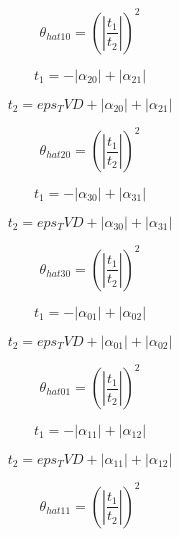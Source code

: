 \documentclass{article}
\begin{document}
\begin{dmath}\theta_{hat 10} = \left(\left|{\frac{t_{1}}{t_{2}}}\right| \right)^{2}\end{dmath}

\begin{dmath}t_{1} = - \left|{\alpha_{20}}\right| + \left|{\alpha_{21}}\right|\end{dmath}

\begin{dmath}t_{2} = eps_TVD + \left|{\alpha_{20}}\right| + \left|{\alpha_{21}}\right|\end{dmath}

\begin{dmath}\theta_{hat 20} = \left(\left|{\frac{t_{1}}{t_{2}}}\right| \right)^{2}\end{dmath}

\begin{dmath}t_{1} = - \left|{\alpha_{30}}\right| + \left|{\alpha_{31}}\right|\end{dmath}

\begin{dmath}t_{2} = eps_TVD + \left|{\alpha_{30}}\right| + \left|{\alpha_{31}}\right|\end{dmath}

\begin{dmath}\theta_{hat 30} = \left(\left|{\frac{t_{1}}{t_{2}}}\right| \right)^{2}\end{dmath}

\begin{dmath}t_{1} = - \left|{\alpha_{01}}\right| + \left|{\alpha_{02}}\right|\end{dmath}

\begin{dmath}t_{2} = eps_TVD + \left|{\alpha_{01}}\right| + \left|{\alpha_{02}}\right|\end{dmath}

\begin{dmath}\theta_{hat 01} = \left(\left|{\frac{t_{1}}{t_{2}}}\right| \right)^{2}\end{dmath}

\begin{dmath}t_{1} = - \left|{\alpha_{11}}\right| + \left|{\alpha_{12}}\right|\end{dmath}

\begin{dmath}t_{2} = eps_TVD + \left|{\alpha_{11}}\right| + \left|{\alpha_{12}}\right|\end{dmath}

\begin{dmath}\theta_{hat 11} = \left(\left|{\frac{t_{1}}{t_{2}}}\right| \right)^{2}\end{dmath}
\end{document}
